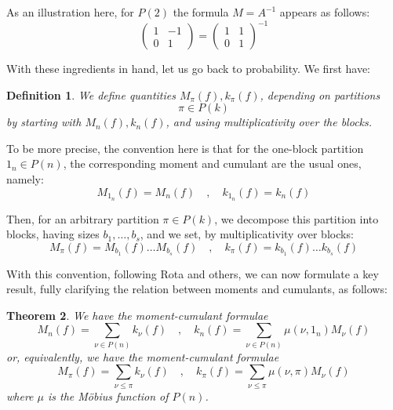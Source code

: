 \documentclass[12pt]{amsbook}
\newtheorem{theorem}{Theorem}[chapter]
\newtheorem{definition}[theorem]{Definition}
\begin{document}
As an illustration here, for $P(2)$ the formula $M=A^{-1}$ appears as follows:
$$\begin{pmatrix}1&-1\\ 0&1\end{pmatrix}=
\begin{pmatrix}1&1\\ 0&1\end{pmatrix}^{-1}$$

With these ingredients in hand, let us go back to probability. We first have:


\begin{definition}
We define quantities $M_\pi(f),k_\pi(f)$, depending on partitions 
$$\pi\in P(k)$$
by starting with $M_n(f),k_n(f)$, and using multiplicativity over the blocks. 
\end{definition}

To be more precise, the convention here is that for the one-block partition $1_n\in P(n)$, the corresponding moment and cumulant are the usual ones, namely:
$$M_{1_n}(f)=M_n(f)\quad,\quad k_{1_n}(f)=k_n(f)$$

Then, for an arbitrary partition $\pi\in P(k)$, we decompose this partition into blocks, having sizes $b_1,\ldots,b_s$, and we set, by multiplicativity over blocks:
$$M_\pi(f)=M_{b_1}(f)\ldots M_{b_s}(f)\quad,\quad k_\pi(f)=k_{b_1}(f)\ldots k_{b_s}(f)$$

With this convention, following Rota and others, we can now formulate a key result, fully clarifying the relation between moments and cumulants, as follows:


\begin{theorem}
We have the moment-cumulant formulae
$$M_n(f)=\sum_{\nu\in P(n)}k_\nu(f)\quad,\quad 
k_n(f)=\sum_{\nu\in P(n)}\mu(\nu,1_n)M_\nu(f)$$
or, equivalently, we have the moment-cumulant formulae
$$M_\pi(f)=\sum_{\nu\leq\pi}k_\nu(f)\quad,\quad 
k_\pi(f)=\sum_{\nu\leq\pi}\mu(\nu,\pi)M_\nu(f)$$
where $\mu$ is the M\"obius function of $P(n)$.
\end{theorem}
\end{document}
